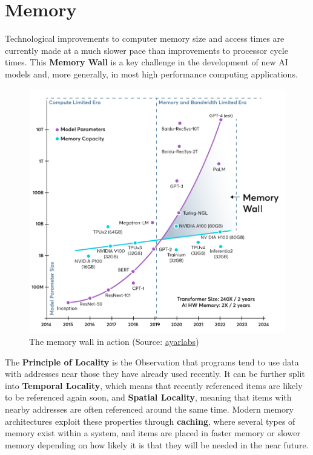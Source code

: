 \documentclass{report}
\newcommand{\tbf}{\textbf}
\newcommand*{\newpar}{\par\vspace{\baselineskip}\noindent} %
\begin{document}
\section{Memory}
Technological improvements to computer memory size and access times are currently made at a much slower pace than improvements to processor cycle times. This \tbf{Memory Wall} is a key challenge in the development of new AI models and, more generally, in most high performance computing applications.
\begin{figure}[h!]
 \centering
 \includegraphics[scale=0.3]{figures/memorywall.png}
 \caption{The memory wall in action (Source: \href{https://ayarlabs.com/wp-content/uploads/2024/05/Memory_Wall_Chart.svg}{ayarlabs})}
\end{figure}
\newpar
The \tbf{Principle of Locality} is the Observation that programs tend to use data with addresses near those they have already used recently. It can be further split into \tbf{Temporal Locality}, which means that recently referenced items are likely to be referenced again soon, and \tbf{Spatial Locality}, meaning that items with nearby addresses are often referenced around the same time. Modern memory architectures exploit these properties through \tbf{caching}, where several types of memory exist within a system, and items  are placed in faster memory or slower memory depending on how likely it is that they will be needed in the near future.
\end{document}
